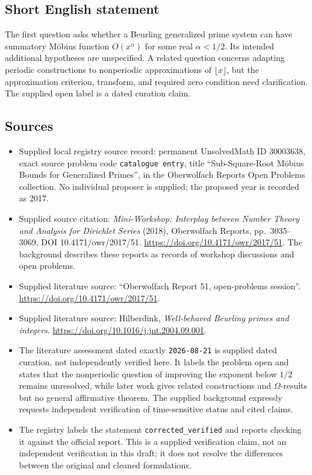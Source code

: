 \documentclass[11pt]{article}
\begin{document}
\subsection{Short English statement}
The first question asks whether a Beurling generalized prime system can have summatory Möbius function \(O(x^\alpha)\) for some real \(\alpha<1/2\). Its intended additional hypotheses are unspecified. A related question concerns adapting periodic constructions to nonperiodic approximations of \(\lfloor x\rfloor\), but the approximation criterion, transform, and required zero condition need clarification. The supplied open label is a dated curation claim.
\subsection{Sources}
\begin{itemize}
\item Supplied local registry source record: permanent UnsolvedMath ID \(30003638\), exact source problem code \texttt{catalogue entry}, title ``Sub-Square-Root Möbius Bounds for Generalized Primes'', in the Oberwolfach Reports Open Problems collection. No individual proposer is supplied; the proposed year is recorded as 2017.
\item Supplied source citation: \emph{Mini-Workshop: Interplay between Number Theory and Analysis for Dirichlet Series} (2018), Oberwolfach Reports, pp.\ 3035--3069, DOI 10.4171/owr/2017/51. \url{https://doi.org/10.4171/owr/2017/51}. The background describes these reports as records of workshop discussions and open problems.
\item Supplied literature source: ``Oberwolfach Report 51, open-problems session''. \url{https://doi.org/10.4171/owr/2017/51}.
\item Supplied literature source: Hilberdink, \emph{Well-behaved Beurling primes and integers}. \url{https://doi.org/10.1016/j.jnt.2004.09.001}.
\item The literature assessment dated exactly \texttt{2026-08-21} is supplied dated curation, not independently verified here. It labels the problem open and states that the nonperiodic question of improving the exponent below \(1/2\) remains unresolved, while later work gives related constructions and \(\Omega\)-results but no general affirmative theorem. The supplied background expressly requests independent verification of time-sensitive status and cited claims.
\item The registry labels the statement \texttt{corrected\_verified} and reports checking it against the official report. This is a supplied verification claim, not an independent verification in this draft; it does not resolve the differences between the original and cleaned formulations.
\end{itemize}
\end{document}

